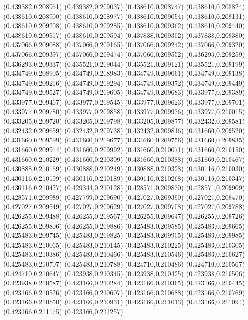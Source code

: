 (0.439382,0.208961)
(0.439382,0.209037)
(0.438610,0.208747)
(0.438610,0.208824)
(0.438610,0.208900)
(0.438610,0.208977)
(0.438610,0.209054)
(0.438610,0.209131)
(0.438610,0.209208)
(0.438610,0.209285)
(0.438610,0.209362)
(0.438610,0.209440)
(0.438610,0.209517)
(0.438610,0.209594)
(0.437838,0.209302)
(0.437838,0.209380)
(0.437066,0.209088)
(0.437066,0.209165)
(0.437066,0.209242)
(0.437066,0.209320)
(0.437066,0.209397)
(0.437066,0.209474)
(0.437066,0.209552)
(0.436293,0.209259)
(0.436293,0.209337)
(0.435521,0.209044)
(0.435521,0.209121)
(0.435521,0.209199)
(0.434749,0.208905)
(0.434749,0.208983)
(0.434749,0.209061)
(0.434749,0.209138)
(0.434749,0.209216)
(0.434749,0.209294)
(0.434749,0.209372)
(0.434749,0.209449)
(0.434749,0.209527)
(0.434749,0.209605)
(0.434749,0.209683)
(0.433977,0.209389)
(0.433977,0.209467)
(0.433977,0.209545)
(0.433977,0.209623)
(0.433977,0.209701)
(0.433977,0.209780)
(0.433977,0.209858)
(0.433977,0.209936)
(0.433977,0.210015)
(0.433205,0.209720)
(0.433205,0.209798)
(0.433205,0.209877)
(0.432432,0.209581)
(0.432432,0.209659)
(0.432432,0.209738)
(0.432432,0.209816)
(0.431660,0.209520)
(0.431660,0.209599)
(0.431660,0.209677)
(0.431660,0.209756)
(0.431660,0.209835)
(0.431660,0.209914)
(0.431660,0.209992)
(0.431660,0.210071)
(0.431660,0.210150)
(0.431660,0.210229)
(0.431660,0.210309)
(0.431660,0.210388)
(0.431660,0.210467)
(0.430888,0.210169)
(0.430888,0.210249)
(0.430888,0.210328)
(0.430116,0.210030)
(0.430116,0.210109)
(0.430116,0.210189)
(0.430116,0.210268)
(0.430116,0.210347)
(0.430116,0.210427)
(0.429344,0.210128)
(0.428571,0.209830)
(0.428571,0.209909)
(0.428571,0.209989)
(0.427799,0.209690)
(0.427027,0.209390)
(0.427027,0.209470)
(0.427027,0.209549)
(0.427027,0.209629)
(0.427027,0.209708)
(0.427027,0.209788)
(0.426255,0.209488)
(0.426255,0.209567)
(0.426255,0.209647)
(0.426255,0.209726)
(0.426255,0.209806)
(0.426255,0.209886)
(0.425483,0.209585)
(0.425483,0.209665)
(0.425483,0.209745)
(0.425483,0.209825)
(0.425483,0.209905)
(0.425483,0.209985)
(0.425483,0.210065)
(0.425483,0.210145)
(0.425483,0.210225)
(0.425483,0.210305)
(0.425483,0.210386)
(0.425483,0.210466)
(0.425483,0.210546)
(0.425483,0.210627)
(0.425483,0.210707)
(0.425483,0.210788)
(0.424710,0.210486)
(0.424710,0.210567)
(0.424710,0.210647)
(0.423938,0.210345)
(0.423938,0.210425)
(0.423938,0.210506)
(0.423938,0.210587)
(0.423166,0.210284)
(0.423166,0.210365)
(0.423166,0.210445)
(0.423166,0.210526)
(0.423166,0.210607)
(0.423166,0.210688)
(0.423166,0.210769)
(0.423166,0.210850)
(0.423166,0.210931)
(0.423166,0.211013)
(0.423166,0.211094)
(0.423166,0.211175)
(0.423166,0.211257)

